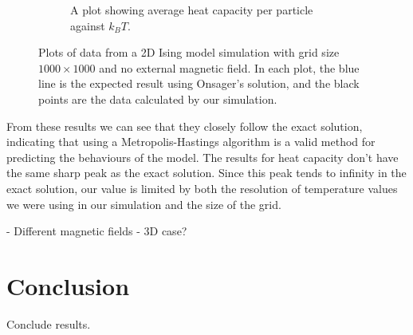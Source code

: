 \documentclass[11pt]{article}
\begin{document}
\begin{figure}[H]
\begin{subfigure}{0.45\textwidth}
\begin{center}
			\end{center}
			\caption{A plot showing average heat capacity per particle against $k_BT$.}
		\end{subfigure}
	
		\caption{Plots of data from a 2D Ising model simulation with grid size $1000 \times 1000$ and no external magnetic field. In each plot, the blue line is the expected result using Onsager's solution, and the black points are the data calculated by our simulation.}
		\label{fig:2d_1000_result}
	\end{figure}
	
	From these results we can see that they closely follow the exact solution, indicating that using a Metropolis-Hastings algorithm is a valid method for predicting the behaviours of the model. The results for heat capacity don't have the same sharp peak as the exact solution. Since this peak tends to infinity in the exact solution, our value is limited by both the resolution of temperature values we were using in our simulation and the size of the grid.
	
	- Different magnetic fields
	- 3D case?
	
	\section{Conclusion}
	
	Conclude results.
	
	\newpage
	 
	
\end{document}
